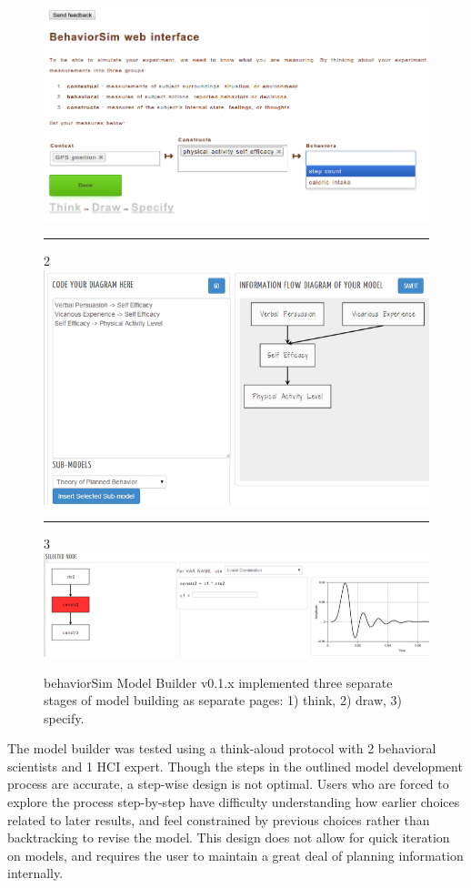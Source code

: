 \documentclass[conference]{IEEEtran}
\begin{document}
\begin{figure}[!t]
  \includegraphics[width=0.9\columnwidth]{img/v1-think}
  \rule{\columnwidth}{0.4pt}
  2
  \includegraphics[width=0.9\columnwidth]{img/v1-draw}
  \rule{\columnwidth}{0.4pt}
  3
  \includegraphics[width=0.9\columnwidth]{img/v1-specify}  
  \caption{behaviorSim Model Builder v0.1.x implemented three separate stages of model building as separate pages: 1) think, 2) draw, 3) specify.}
  \label{model-builder-v1}
\end{figure}

The model builder was tested using a think-aloud protocol with 2 behavioral scientists and 1 HCI expert. 
Though the steps in the outlined model development process are accurate, a step-wise design is not optimal.
Users who are forced to explore the process step-by-step have difficulty understanding how earlier choices related to later results, and feel constrained by previous choices rather than backtracking to revise the model.
This design does not allow for quick iteration on models, and requires the user to maintain a great deal of planning information internally.
\end{document}
